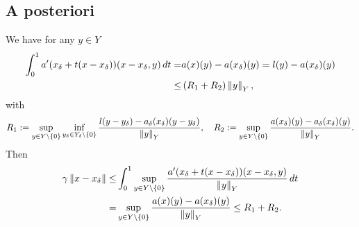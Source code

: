 \documentclass[english,12pt,a4paper]{article}
\begin{document}
\subsection{A posteriori}\label{subsec:}
%
We have for any $y\in Y$
%
\begin{align*}
\int_0^1a'(x_{\delta}+t(x-x_{\delta}))(x-x_{\delta},y)\,dt =& a(x)(y) - a(x_{\delta})(y)
= l(y) - a(x_{\delta})(y)\\ \le&  \left(R_1 + R_2\right)\left\|y\right\|_Y,
\end{align*}
%
with
%
\begin{align*}
R_1 := \sup_{y\in Y\setminus\left\{0\right\}}\inf_{y_{\delta}\in Y_{\delta}\setminus\left\{0\right\}}\frac{l(y-y_{\delta}) - a_{\delta}(x_{\delta})(y-y_{\delta})}{\left\|y\right\|_Y} ,\quad R_2 :=  \sup_{y\in Y\setminus\left\{0\right\}}\frac{a(x_{\delta})(y)-a_{\delta}(x_{\delta})(y)}{\left\|y\right\|_Y}. 
\end{align*}
%
Then
%
\begin{align*}
\gamma \left\|x-x_{\delta}\right\| \le& \int_0^1\sup_{y\in Y\setminus\left\{0\right\}}\frac{a'(x_{\delta}+t(x-x_{\delta}))(x-x_{\delta},y)}{\left\|y\right\|_Y}\,dt\\ =& 
\sup_{y\in Y\setminus\left\{0\right\}}\frac{a(x)(y) - a(x_{\delta})(y)}{\left\|y\right\|_Y} \le R_1 + R_2.
\end{align*}
%







\end{document}
